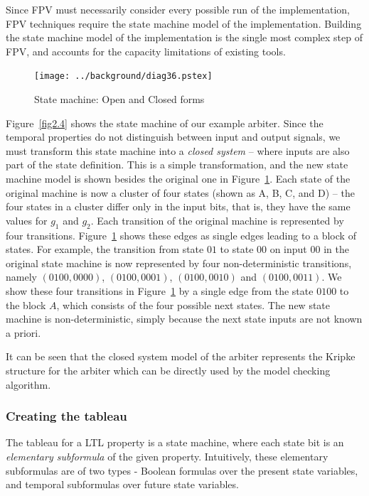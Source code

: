 \noindent
Since FPV must necessarily consider every possible run of the implementation,
FPV techniques require the state machine model of the implementation. 
Building the state machine model of the implementation is the single most
complex step of FPV, and accounts for the capacity limitations of existing
tools.

\begin{figure}[htb]
\centering
\texttt{[image: ../background/diag36.pstex]}
\caption{State machine: Open and Closed forms} \label{fig2.5}
\end{figure}

\noindent
Figure~\ref{fig2.4} shows the state machine of our example arbiter.
Since the temporal properties do not distinguish between input and output
signals, we must transform this state machine into a {\em closed system}
-- where inputs are also part of the state definition. This is a simple
transformation, and the new state machine model is shown besides the original
one in Figure~\ref{fig2.5}. Each state of the original machine is now a cluster
of four states (shown as A, B, C, and D) -- the four states in a cluster
differ only in the input bits, that is, they have the same values for
$g_1$ and $g_2$. Each transition of the original machine is represented by
four transitions. Figure~\ref{fig2.5} shows these edges as
single edges leading to a block of states. For example, the transition from
state $01$ to state $00$ on input $00$ in the original state machine is now
represented by four non-deterministic transitions, namely $(0100, 0000)$, 
$(0100, 0001)$, $(0100, 0010)$ and $(0100, 0011)$. We show these four 
transitions in Figure~\ref{fig2.5} by a single edge from the state $0100$ 
to the 
block $A$, which consists of the four possible next states.
The new state machine is non-deterministic, simply because the next state
inputs are not known a priori.

\noindent
It can be seen that the closed system model of the arbiter represents the
Kripke structure for the arbiter which can be directly used by the model 
checking algorithm.

\subsubsection{Creating the tableau}
The tableau for a LTL property is 
a state machine, where each state bit is an {\em elementary subformula}
of the given property. Intuitively, these elementary subformulas are of two
types - Boolean formulas over the present state variables, and temporal
subformulas over future state variables.

